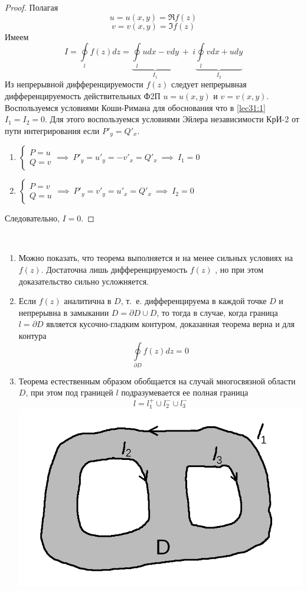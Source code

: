 \documentclass[../../main.tex]{subfiles}
\begin{document}
\begin{proof}
	Полагая
	\[ u = u(x, y) = \Re f(z) \]
	\[ v = v(x, y) = \Im f(z) \]
	Имеем
	\begin{equation}
		\label{lec31:1}
		 I = \oint\limits_{l} f(z) dz =
		\underbrace{ \oint\limits_{l} u dx - v dy }_{I_1}
		\ + \ i \underbrace{ \oint\limits_{l} v dx + u dy }_{I_2}
	\end{equation}
	Из непрерывной дифференцируемости $f(z)$ следует непрерывная
	дифференцируемость действительных Ф2П $u = u(x, y)$ и $ v = v(x, y)$.
	Воспользуемся условиями Коши-Римана для обоснования что в
	\eqref{lec31:1} $I_1 = I_2 = 0$. Для этого воспользуемся условиями
	Эйлера независимости КрИ-2 от пути интегрирования если
	$P'_y = Q'_x $.
	\begin{enumerate}
		\item $\begin{cases}
				P = u \\
				Q = v
			\end{cases} \implies \ P'_y = u'_y = -v'_x = Q'_x
			\ \implies \ I_1 = 0 $
		\item $\begin{cases}
			P = v \\
			Q = u
		\end{cases} \implies \ P'_y = v'_y = u'_x = Q'_x
		\ \implies \ I_2 = 0 $
	\end{enumerate}
	Следовательно, $I = 0$.
\end{proof}
\begin{rems}
	\
\end{rems}
\begin{enumerate}
		\item Можно показать, что теорема выполняется и на менее сильных
			условиях на $f(z)$. Достаточна лишь дифференцируемость $f(z)$
			, но при этом доказательство сильно усложняется.
		\item Если $f(z)$ аналитична в $D$, т.~е. дифференцируема в каждой
			точке $D$ и непрерывна в замыкании $D = \partial D \cup D$,
			то тогда в случае, когда граница $ l = \partial D$ является
			кусочно-гладким контуром, доказанная теорема верна и для
			контура
			\[ \oint\limits_{\partial D} f(z) dz = 0 \]
		\item Теорема естественным образом обобщается на случай
			многосвязной области $D$, при этом под границей $l$
			подразумевается ее полная граница
			\[ l = l_1^+ \cup l_2^- \cup l_3^- \]
			\includegraphics[scale = 0.3]{lec31_1.png}
\end{enumerate}
\end{document}
